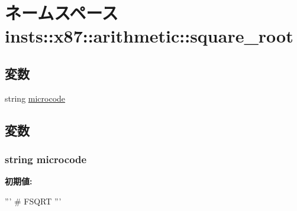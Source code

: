 \hypertarget{namespaceinsts_1_1x87_1_1arithmetic_1_1square__root}{
\section{ネームスペース insts::x87::arithmetic::square\_\-root}
\label{namespaceinsts_1_1x87_1_1arithmetic_1_1square__root}
}
\subsection*{変数}
\begin{DoxyCompactItemize}
\item 
string \hyperlink{namespaceinsts_1_1x87_1_1arithmetic_1_1square__root_a770f11a173e99389a8802f0107ed8f52}{microcode}
\end{DoxyCompactItemize}


\subsection{変数}
\hypertarget{namespaceinsts_1_1x87_1_1arithmetic_1_1square__root_a770f11a173e99389a8802f0107ed8f52}{
\subsubsection[{microcode}]{\setlength{\rightskip}{0pt plus 5cm}string {\bf microcode}}}
\label{namespaceinsts_1_1x87_1_1arithmetic_1_1square__root_a770f11a173e99389a8802f0107ed8f52}
{\bfseries 初期値:}
\begin{DoxyCode}
'''
# FSQRT
'''
\end{DoxyCode}

